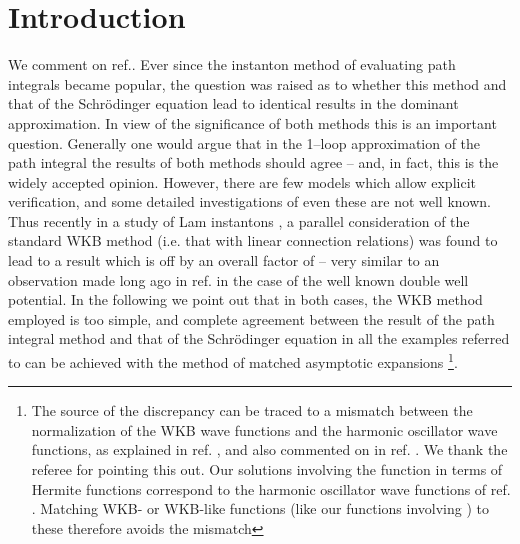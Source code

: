 \documentclass[a4paper,12pt,a4]{article}
\begin{document}
\section{Introduction}
We comment on ref.\cite{1}.
Ever since the instanton method of evaluating path 
integrals became popular, the question was raised
as to whether this method and that of the Schr\"odinger equation
lead to identical results in the dominant
approximation.  In view of the significance of
both methods this is an important question. Generally
one would argue
that in the 1--loop approximation of the
path integral the results of both methods
should agree -- and, in fact,
this is the widely accepted opinion.  However, there are
few models which allow explicit verification, and some detailed
investigations of even
these are not well known.  Thus recently in a study of Lam\coordHE{}
 instantons \cite{1}, a parallel consideration of the
standard WKB method (i.e. that with linear connection
relations) was found to lead to a  result which is
off by an overall factor of \coordHE{}  --
very similar to an observation made long ago in ref.\cite{2} in the case of
the well known double well potential.  In the following we point
out that in both cases, the WKB method  employed is too
simple, and complete agreement between
the result of the path integral method and that of
the Schr\"odinger equation
in all the examples referred to can be achieved with the
method of matched asymptotic expansions
 \footnote{The source of the discrepancy can be traced to a
mismatch between the normalization of the WKB
wave functions and the harmonic oscillator wave functions, as
explained in ref. \cite{3}, 
and also commented on
in ref. \cite{4}.
We thank the referee for pointing this out.
Our solutions involving the function \coordHE{}
in terms of Hermite functions
correspond to the harmonic oscillator wave functions
of ref. \cite{3}. Matching WKB- or WKB-like functions
(like our functions involving \coordHE{})
to these therefore avoids the mismatch}.
\end{document}
